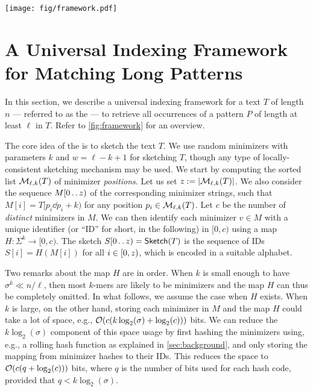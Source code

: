 \begin{figure*}[t]
    \centering
    \texttt{[image: fig/framework.pdf]}
    \caption{The \uindex framework. The steps (1) and (2) are to build the index. The steps (3)--(6) are to query with the framework. The sketching scheme in steps (1) and (3) must be the same.}
    \label{fig:framework}
\end{figure*}

\section{A Universal Indexing Framework for Matching Long Patterns}\label{sec:framework}

In this section, we describe a universal indexing framework for a text $T$ of length $n$ --- referred to as the {\uindex} --- to retrieve all occurrences of a pattern $P$ of length at least $\ell$ in $T$.
Refer to \cref{fig:framework} for an overview.

 The core idea of the {\uindex} is to sketch the text $T$.
We use random minimizers with parameters $k$ and $w=\ell-k+1$ for sketching $T$,
though any type of locally-consistent sketching mechanism may be used. We start by computing the sorted list $\mathcal{M}_{\ell,k}(T)$ of minimizer \emph{positions}.
Let us set $z:=|\mathcal{M}_{\ell,k}(T)|$.
We also consider the sequence $M[0 \mathinner{.\,.} z)$ of the corresponding minimizer strings,
such that  $M[i] = T[p_i \dd p_i+k)$ for any position $p_i \in \mathcal{M}_{\ell,k}(T)$.
Let $c$ be the number of \textit{distinct} minimizers in $M$.
We can then identify each minimizer $v\in M$ with a unique identifier (or ``ID'' for short, in the following) in $[0,c)$ using a map $H : \Sigma^k \to [0,c)$.
The sketch $S[0 \mathinner{.\,.} z)=\textup{\textsf{Sketch}}(T)$ is the sequence of IDs $S[i]=H(M[i])$ for all $i \in [0, z)$, which is encoded in a suitable alphabet.

Two remarks about the map $H$ are in order. When $k$ is small enough to have $\sigma^k \ll
n/\ell$, then most $k$-mers are likely to be minimizers and the map $H$ can thus be
completely omitted. In what follows, we assume the case when $H$ exists.   
When $k$ is large, on the other hand,
storing each minimizer in $M$ and the map $H$ could take a lot of space, e.g., $\mathcal{O}(c (k\log_2(\sigma)+\log_2(c)))$ bits.
We can reduce the $k\log_2(\sigma)$ component of this space usage by first hashing the minimizers using, e.g., a rolling hash function as explained in \cref{sec:background},
and only storing the mapping from minimizer hashes to their IDs.
This reduces the space to $\mathcal{O}(c(q+\log_2(c)))$ bits, where $q$ is the number of bits used for each hash code, provided that $q < k\log_2(\sigma)$.

